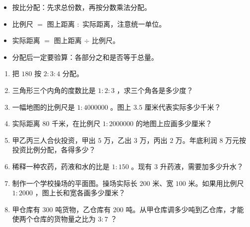 \begin{keytakeaway}


\begin{itemize}
  \item 按比分配：先求总份数，再按分数乘法分配。
  \item 比例尺 $=$ 图上距离 $:$ 实际距离，注意统一单位。
  \item 实际距离 $=$ 图上距离 $\div$ 比例尺。
  \item 分配后一定要验算：各部分之和是否等于总量。
\end{itemize}


\end{keytakeaway}

\begin{practice}


\begin{enumerate}
  \item 把 $180$ 按 $2 : 3 : 4$ 分配。
  \item 三角形三个内角的度数比是 $1 : 2 : 3$ ，求三个角各是多少度？
  \item 一幅地图的比例尺是 $1 : 4000000$ 。图上 $3.5$ 厘米代表实际多少千米？
  \item 实际距离 $80$ 千米，在比例尺 $1 : 2000000$ 的地图上应画多少厘米？
  \item 甲乙丙三人合伙投资，甲出 $5$ 万，乙出 $3$ 万，丙出 $2$ 万。年底利润 $8$ 万元按投资比例分配，各得多少？
  \item 稀释一种农药，药液和水的比是 $1 : 150$ 。现有 $3$ 升药液，需要加多少升水？
  \item 制作一个学校操场的平面图。操场实际长 $200$ 米、宽 $100$ 米。如果用比例尺 $1 : 2000$ ，图上长和宽各画多少厘米？
  \item 甲仓库有 $300$ 吨货物，乙仓库有 $200$ 吨。从甲仓库调多少吨到乙仓库，才能使两个仓库的货物量之比为 $3 : 7$ ？
\end{enumerate}


\end{practice}



